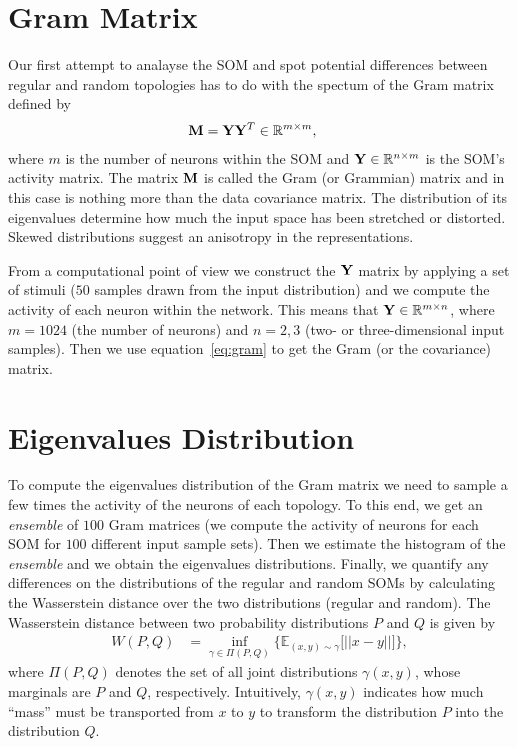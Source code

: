 \documentclass[10pt]{article}
\theoremstyle{definition}
\begin{document}
\section{Gram Matrix}%
\label{sec:gram}
Our first attempt to analayse the SOM and spot potential differences between 
regular and random topologies has to do with the spectum of the Gram matrix 
defined by
\begin{align}
    \label{eq:gram}
    {\bf M} &= {\bf Y}{\bf Y}^T \in \mathbb{R}^{m \times m},
\end{align}
where $m$ is the number of neurons within the SOM and ${\bf Y} \in \mathbb{R}^{n \times m}$
is the SOM's activity matrix. The matrix ${\bf M}$ is called the Gram (or Grammian) 
matrix and in this case is nothing more than the data covariance matrix. The
distribution of its eigenvalues determine how much the input space has been
stretched or distorted. Skewed distributions suggest an anisotropy in the 
representations.

From a computational point of view we construct the ${\bf Y}$ matrix by
applying a set of stimuli ($50$ samples drawn from the input distribution) 
and we compute the activity of each neuron within the network. This means that
${\bf Y} \in \mathbb{R}^{m \times n}$, where $m=1024$ (the number of neurons)
and $n={2, 3}$ (two- or three-dimensional input samples). Then we use
equation~\eqref{eq:gram} to get the Gram (or the covariance) matrix. 

\section{Eigenvalues Distribution}%
\label{sec:dist}

To compute the eigenvalues distribution of the Gram matrix we need to sample
a few times the activity of the neurons of each topology. To this end, we 
get an \emph{ensemble} of $100$ Gram matrices (we compute the activity of 
neurons for each SOM for $100$ different input sample sets). Then we estimate
the histogram of the \emph{ensemble} and we obtain the eigenvalues
distributions. Finally, we quantify any differences on the distributions 
of the regular and random SOMs by calculating the Wasserstein distance over
the two distributions (regular and random). The Wasserstein distance between
two probability distributions $P$ and $Q$ is given by
\begin{align}
    W(P, Q) &= \inf_{\gamma \in \Pi(P, Q)}\{\mathbb{E}_{(x, y)\sim \gamma}\Big[||x -
    y||\Big]\},
\end{align}
where $\Pi(P, Q)$ denotes the set of all joint distributions $\gamma (x, y)$, 
whose marginals are $P$ and $Q$, respectively. Intuitively, $\gamma (x,y)$
indicates  how  much ``mass'' must be transported from $x$ to $y$ to transform
the distribution $P$ into the distribution $Q$. 
\end{document}
